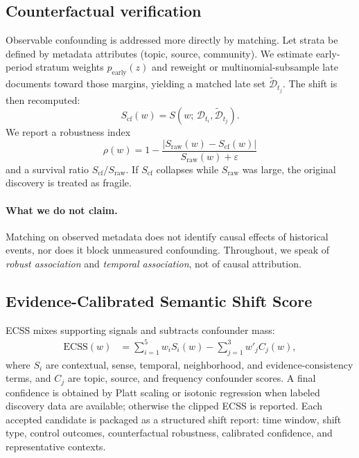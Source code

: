 \documentclass[journal]{IEEEtran}
\begin{document}
\subsection{Counterfactual verification}
Observable confounding is addressed more directly by matching.
Let strata be defined by metadata attributes (topic, source, community).
We estimate early-period stratum weights $p_{\mathrm{early}}(z)$ and reweight or multinomial-subsample late documents toward those margins, yielding a matched late set $\tilde{\mathcal{D}}_{t_j}$.
The shift is then recomputed:
\begin{equation}
S_{\mathrm{cf}}(w)=S\!\left(w;\,\mathcal{D}_{t_i},\tilde{\mathcal{D}}_{t_j}\right).
\end{equation}
We report a robustness index
\begin{equation}
\rho(w)=1-\frac{\lvert S_{\mathrm{raw}}(w)-S_{\mathrm{cf}}(w)\rvert}{S_{\mathrm{raw}}(w)+\varepsilon}
\end{equation}
and a survival ratio $S_{\mathrm{cf}}/S_{\mathrm{raw}}$.
If $S_{\mathrm{cf}}$ collapses while $S_{\mathrm{raw}}$ was large, the original discovery is treated as fragile.

\paragraph{What we do not claim.}
Matching on observed metadata does not identify causal effects of historical events, nor does it block unmeasured confounding.
Throughout, we speak of \emph{robust association} and \emph{temporal association}, not of causal attribution.

\subsection{Evidence-Calibrated Semantic Shift Score}
ECSS mixes supporting signals and subtracts confounder mass:
\begin{equation}
\begin{aligned}
\mathrm{ECSS}(w)
&=
\sum_{i=1}^{5} w_i S_i(w)
-
\sum_{j=1}^{3} w'_j C_j(w),
\end{aligned}
\end{equation}
where $S_i$ are contextual, sense, temporal, neighborhood, and evidence-consistency terms, and $C_j$ are topic, source, and frequency confounder scores.
A final confidence is obtained by Platt scaling or isotonic regression when labeled discovery data are available; otherwise the clipped ECSS is reported.
Each accepted candidate is packaged as a structured shift report: time window, shift type, control outcomes, counterfactual robustness, calibrated confidence, and representative contexts.
\end{document}
